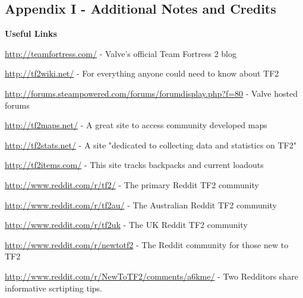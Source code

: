 \subsection{Appendix I - Additional Notes and Credits}
\newenvironment{packed_item}{
\begin{itemize}
  \setlength{\itemsep}{1pt}
  \setlength{\parskip}{0pt}
  \setlength{\parsep}{0pt}
}{\end{itemize}}


{\bf Useful Links}

\url{http://teamfortress.com/} - Valve's official Team Fortress 2 blog

\url{http://tf2wiki.net/} - For everything anyone could need to know about TF2

\url{http://forums.steampowered.com/forums/forumdisplay.php?f=80} - Valve hosted forums 

\url{http://tf2maps.net/} - A great site to access community developed maps

\url{http://tf2stats.net/} - A site "dedicated to collecting data and statistics on TF2"

\url{http://tf2items.com/} - This site tracks backpacks and current loadouts

\url{http://www.reddit.com/r/tf2/} - The primary Reddit TF2 community

\url{http://www.reddit.com/r/tf2au/} - The Australian Reddit TF2 community

\url{http://www.reddit.com/r/tf2uk} - The UK Reddit TF2 community

\url{http://www.reddit.com/r/newtotf2} - The Reddit community for those new to TF2

\url{http://www.reddit.com/r/NewToTF2/comments/a6kme/} - Two Redditors share informative scrtipting tips.


